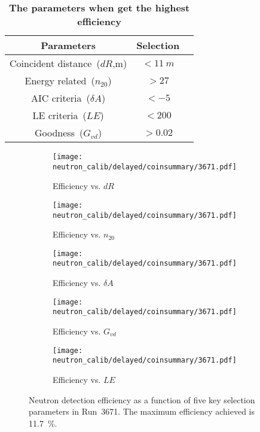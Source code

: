 \begin{table}[htbp]
	\caption{\textbf{The parameters when get the highest efficiency}}%
	\label{tab:param-scan-eff}
	\centering%
	\begin{tabular}{ccc}
		\toprule%
		Parameters                   & Selection     \\
		\midrule%
		Coincident distance~($dR$,m) & $<\SI{11}{m}$ \\
		Energy related~($n_{20}$)    & $>27$         \\
		AIC criteria~($\delta A$)    & $<-5$         \\
		LE criteria~($LE$)           & $<200$        \\
		Goodness~($G_{vd}$)          & $>0.02$       \\
		\bottomrule
	\end{tabular}
\end{table}

\begin{figure}[h]
	\centering
	\begin{subfigure}{0.5\textwidth}
		\centering
		\texttt{[image: neutron\_calib/delayed/coinsummary/3671.pdf]}
		\caption{Efficiency vs. $dR$}
		\label{fig:effdR}
	\end{subfigure}%
	\begin{subfigure}{0.5\textwidth}
		\centering
		\texttt{[image: neutron\_calib/delayed/coinsummary/3671.pdf]}
		\caption{Efficiency vs. $n_{20}$}
		\label{fig:effn20}
	\end{subfigure}
	\begin{subfigure}{0.5\textwidth}
		\centering
		\texttt{[image: neutron\_calib/delayed/coinsummary/3671.pdf]}
		\caption{Efficiency vs. $\delta A$}
		\label{fig:effdA}
	\end{subfigure}%
	\begin{subfigure}{0.5\textwidth}
		\centering
		\texttt{[image: neutron\_calib/delayed/coinsummary/3671.pdf]}
		\caption{Efficiency vs. $G_{vd}$}
		\label{fig:effGvd}
	\end{subfigure}
	\begin{subfigure}{0.5\textwidth}
		\centering
		\texttt{[image: neutron\_calib/delayed/coinsummary/3671.pdf]}
		\caption{Efficiency vs. $LE$}
		\label{fig:effLE}
	\end{subfigure}
	\caption{Neutron detection efficiency as a function of five key selection parameters in Run~3671. The maximum efficiency achieved is \SI{11.7}{\%}.}
	\label{fig:High-eff}
\end{figure}

